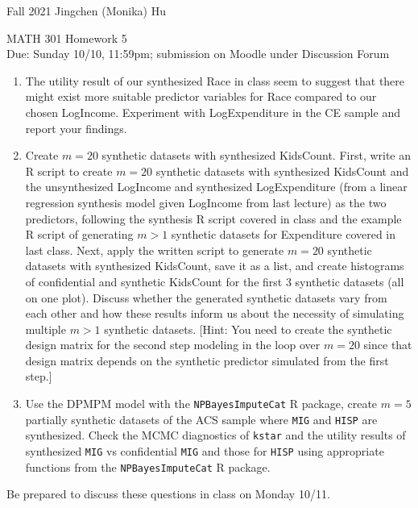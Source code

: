 \documentclass[11pt]{article}
\begin{document}
\enlargethispage{\baselineskip}

Fall 2021 \hfill Jingchen (Monika) Hu\\

\begin{center}
{\huge MATH 301 Homework 5}	\\
Due: Sunday 10/10, 11:59pm; submission on Moodle under Discussion Forum
\end{center}
\vspace{0.5cm}

\begin{enumerate}
\item The utility result of our synthesized Race in class seem to suggest that there might exist more suitable predictor variables for Race compared to our chosen LogIncome. Experiment with LogExpenditure in the CE sample and report your findings. 

\item Create $m = 20$ synthetic datasets with synthesized KidsCount. First, write an R script to create $m = 20$ synthetic datasets with synthesized KidsCount and the unsynthesized LogIncome and synthesized LogExpenditure (from a linear regression synthesis model given LogIncome from last lecture) as the two predictors, following the synthesis R script covered in class and the example R script of generating $m > 1$ synthetic datasets for Expenditure covered in last class. Next, apply the written script to generate $m = 20$ synthetic datasets with synthesized KidsCount, save it as a list, and create histograms of confidential and synthetic KidsCount for the first 3 synthetic datasets (all on one plot). Discuss whether the generated synthetic datasets vary from each other and how these results inform us about the necessity of simulating multiple $m > 1$ synthetic datasets. [Hint: You need to create the synthetic design matrix for the second step modeling in the loop over $m = 20$ since that design matrix depends on the synthetic predictor simulated from the first step.]

\item Use the DPMPM model with the \texttt{NPBayesImputeCat} R package, create $m = 5$ partially synthetic datasets of the ACS sample where \texttt{MIG} and \texttt{HISP} are synthesized. Check the MCMC diagnostics of \texttt{kstar} and the utility results of synthesized \texttt{MIG} vs confidential \texttt{MIG} and those for \texttt{HISP} using appropriate functions from the \texttt{NPBayesImputeCat} R package.

\end{enumerate}

Be prepared to discuss these questions in class on Monday 10/11.
\end{document}
